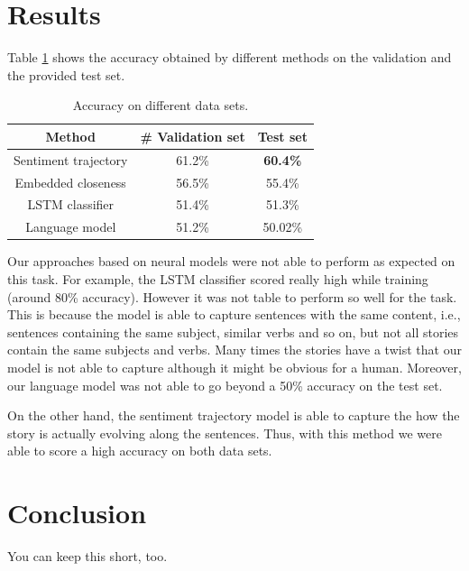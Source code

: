\documentclass{article}
\newcommand{\lstm}{LSTM }
\begin{document}
\section{Results}
\label{sec:results}

Table \ref{tab:results} shows the accuracy obtained by different methods on the
validation and the provided test set. 

\begin{table}
    \caption{Accuracy on different data sets.}
    \begin{center}
        \label{tab:results}
        \begin{tabular}{||c c c||} 
            \hline
            Method                 & \# Validation set         & Test set \\ [0.5ex] 
            \hline\hline
            Sentiment trajectory   & 61.2\%                    & \textbf{60.4\%} \\ 
            \hline
            Embedded closeness     & 56.5\%                    & 55.4\% \\
            \hline
            LSTM classifier        & 51.4\%                    & 51.3\% \\ 
            \hline
            Language model         & 51.2\%                    & 50.02\% \\ [1ex] 
            \hline
        \end{tabular}
    \end{center}
\end{table}

Our approaches based on neural models were not able to perform as expected on
this task. For example, the \lstm classifier scored really high while training
(around 80\% accuracy). However it was not table to perform so well for the
task. This is because the model is able to capture sentences with the same
content, i.e., sentences containing the same subject, similar verbs and so on,
but not all stories contain the same subjects and verbs. Many times the stories
have a twist that our model is not able to capture although it might be obvious
for a human. Moreover, our language model was not able to go beyond a 50\%
accuracy on the test set. 

On the other hand, the sentiment trajectory model is able to capture the how the
story is actually evolving along the sentences. Thus, with this method we were
able to score a high accuracy on both data sets.


\section{Conclusion}
You can keep this short, too. \cite{*}



\end{document}
